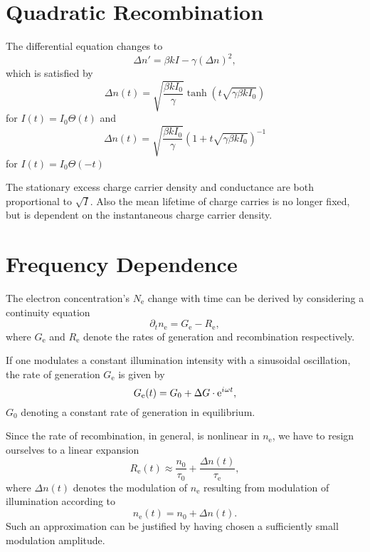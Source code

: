 \section{Quadratic Recombination}\label{sec:quad-recomb}
The differential equation changes to
\begin{equation*}
	\Delta n' = \beta k I - \gamma (\Delta n)^2,
\end{equation*}
which is satisfied by
\begin{equation*}
	\Delta n (t) = \sqrt{\frac{\beta k I_0}{\gamma}} \tanh \left(t \sqrt{\gamma \beta k I_0} \right)
\end{equation*}
for $I(t) = I_0 \Theta (t)$ and
\begin{equation*}
	\Delta n (t) = \sqrt{\frac{\beta k I_0}{\gamma}} \left(1 + t \sqrt{\gamma \beta k I_0} \right)^{-1}
\end{equation*}
for $I(t) = I_0 \Theta (-t)$

The stationary excess charge carrier density and conductance are both proportional to $\sqrt{I}$.
Also the mean lifetime of charge carries is no longer fixed, but is dependent on the instantaneous charge carrier density.

\section{Frequency Dependence}
The electron concentration's $N_\text{e}$ change with time can be derived by considering a continuity equation
\begin{equation}\label{eq:cont_el}
	\partial_tn_\text{e} = G_\text{e} - R_\text{e},
\end{equation}
where $G_\text{e}$ and $R_\text{e}$ denote the rates of generation and recombination respectively.

If one modulates a constant illumination intensity with a sinusoidal oscillation, the rate of generation $G_\text{e}$ is given by
\begin{equation}\label{eq:genrate}
	G_\text{e}(t) = G_0 + \Delta G\cdot\mathrm{e}^{{i\mkern1mu}\omega t},
\end{equation}
$G_0$ denoting a constant rate of generation in equilibrium.

Since the rate of recombination, in general, is nonlinear in $n_\text{e}$, we have to resign ourselves to a linear expansion
\begin{equation}\label{eq:rerate}
	R_\text{e}(t)\approx \frac{n_0}{\tau_0} + \frac{\Delta n(t)}{\tau_\text{e}},
\end{equation}
where $\Delta n(t)$ denotes the modulation of $n_\text{e}$ resulting from modulation of illumination according to
\begin{equation}\label{eq:ansatz_n}
	n_\text{e}(t) = n_0 + \Delta n(t).
\end{equation}
Such an approximation can be justified by having chosen a sufficiently small modulation amplitude.

